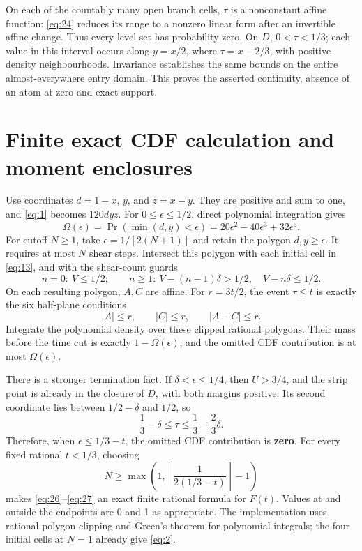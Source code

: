 \documentclass[11pt]{amsart}
\begin{document}
On each of the countably many open branch cells, \(\tau\) is a nonconstant affine function: \eqref{eq:24} reduces its range to a nonzero linear form after an invertible affine change. Thus every level set has probability zero. On \(D\), \(0<\tau<1/3\); each value in this interval occurs along \(y=x/2\), where \(\tau=x-2/3\), with positive-density neighbourhoods. Invariance establishes the same bounds on the entire almost-everywhere entry domain. This proves the asserted continuity, absence of an atom at zero and exact support.

\section{Finite exact CDF calculation and moment enclosures}

Use coordinates \(d=1-x\), \(y\), and \(z=x-y\). They are positive and sum to one, and \eqref{eq:1} becomes \(120dyz\). For \(0\le\epsilon\le1/2\), direct polynomial integration gives \begin{equation}\label{eq:25}
\Omega(\epsilon)=\Pr(\min(d,y)<\epsilon)
     =20\epsilon^2-40\epsilon^3+32\epsilon^5.
\end{equation} For cutoff \(N\ge1\), take \(\epsilon=1/[2(N+1)]\) and retain the polygon \(d,y\ge\epsilon\). It requires at most \(N\) shear steps. Intersect this polygon with each initial cell in \eqref{eq:13}, and with the shear-count guards \begin{equation}\label{eq:26}
n=0:\ V\le1/2;\qquad
 n\ge1:\ V-(n-1)\delta>1/2,\quad V-n\delta\le1/2.
\end{equation} On each resulting polygon, \(A,C\) are affine. For \(r=3t/2\), the event \(\tau\le t\) is exactly the six half-plane conditions \begin{equation}\label{eq:27}
|A|\le r,\qquad |C|\le r,\qquad |A-C|\le r.
\end{equation} Integrate the polynomial density over these clipped rational polygons. Their mass before the time cut is exactly \(1-\Omega(\epsilon)\), and the omitted CDF contribution is at most \(\Omega(\epsilon)\).

There is a stronger termination fact. If \(\delta<\epsilon\le1/4\), then \(U>3/4\), and the strip point is already in the closure of \(D\), with both margins positive. Its second coordinate lies between \(1/2-\delta\) and \(1/2\), so \begin{equation}\label{eq:28}
\frac13-\delta\le\tau\le\frac13-\frac23\delta.
\end{equation} Therefore, when \(\epsilon\le1/3-t\), the omitted CDF contribution is \textbf{zero}. For every fixed rational \(t<1/3\), choosing \[N\ge\max\left(1,\left\lceil\frac1{2(1/3-t)}\right\rceil-1\right)\] makes \eqref{eq:26}--\eqref{eq:27} an exact finite rational formula for \(F(t)\). Values at and outside the endpoints are 0 and 1 as appropriate. The implementation uses rational polygon clipping and Green's theorem for polynomial integrals; the four initial cells at \(N=1\) already give \eqref{eq:2}.
\end{document}
